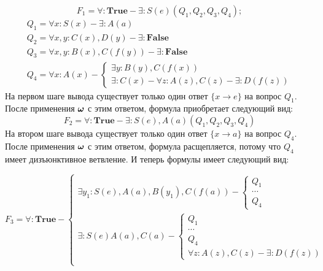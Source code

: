 \begin{example}\label{proofexample}


\begin{equation*}\label{ex:f1}
	F_1 = \forall\colon\boldsymbol{True} - \exists\colon S(e)(Q_1,Q_2,Q_3,Q_4);
\end{equation*}
\begin{equation*}
	\begin{array}{l}
	Q_1 = \forall x\colon S(x) - \exists\colon A(a) \\
	Q_2 = \forall x,y\colon C(x),D(y) - \exists\colon\boldsymbol{False} \\
	Q_3 = \forall x,y\colon B(x),C(f(y)) - \exists\colon\boldsymbol{False} \\
	Q_4 =
	\forall x\colon A(x) -
	\left\lbrace
	\begin{array}{l}
		\exists y\colon B(y),C(f(x)) \\
		\exists \colon C(x) - \forall z\colon A(z),C(z) - \exists\colon D(f(z))
	\end{array}\right.
	\end{array}
\end{equation*}
На первом шаге вывода существует только один ответ $\{x \rightarrow e\}$ на вопрос $Q_1$. После применения $\boldsymbol{\omega}$ с этим ответом, формула приобретает следующий вид:
\begin{equation*}\label{ex:f2}
	F_2 = \forall\colon\boldsymbol{True} - \exists\colon S(e),A(a)(Q_1,Q_2,Q_3,Q_4)
\end{equation*}
На втором шаге вывода существует только один ответ $\{x \rightarrow a\}$ на вопрос $Q_4$. После применения $\boldsymbol{\omega}$ с этим ответом, формула расщепляется, потому что $Q_4$ имеет дизъюнктивное ветвление. И теперь формулы имеет следующий вид:

\begin{equation*}\label{ex:f3}
F_3 =
\forall:\boldsymbol{True} -
\left\lbrace
\begin{array}{l}
	\exists y_1\colon S(e),A(a),B(y_1),C(f(a)) -
	\left\lbrace
	\begin{array}{l}
		Q_1 \\ \cdots \\ Q_4
	\end{array}\right. \\
	\exists\colon S(e)A(a),C(a) -
	\left\lbrace
	\begin{array}{l}
		Q_1 \\ \cdots \\ Q_4 \\
		\forall z\colon A(z),C(z) - \exists\colon D(f(z))
	\end{array}\right. \\
\end{array}\right.
\end{equation*}


\end{example}
